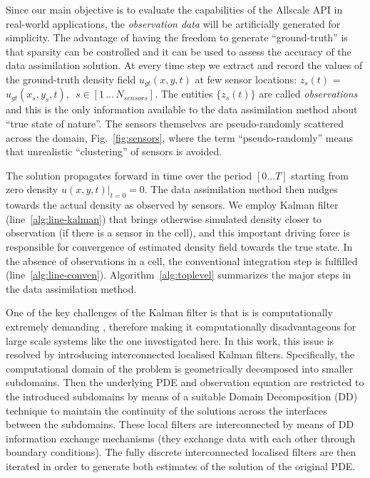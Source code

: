 \documentclass[acmsmall,review,anonymous]{acmart}\settopmatter{printfolios=true,printccs=false,printacmref=false}
\begin{document}
Since our main objective is to evaluate the capabilities of the Allscale API in real-world applications, the \textit{observation data} will be artificially generated for simplicity. The advantage of having the freedom to generate ``ground-truth'' is that sparsity can be controlled and it can be used to assess the accuracy of the data assimilation solution.  At every time step we extract and record the values of the ground-truth density field $u_{gt}(x,y,t)$ at few sensor locations: $z_s(t)$ = $u_{gt}(x_s,y_s,t)$, $\,\,s \in [1\,{\ldots}\,N_{sensors}]$. The entities $\{z_s(t)\}$ are called \textit{observations} and this is the only information available to the data assimilation method about ``true state of nature''. The sensors themselves are pseudo-randomly scattered across the domain, Fig.~\ref{fig:sensors}, where the term ``pseudo-randomly'' means that unrealistic ``clustering'' of sensors is avoided. 

The solution propagates forward in time over the period $[0 \ldots T]$ starting from zero density $u(x,y,t)\rvert_{t=0} = 0$. The data assimilation method then nudges towards the actual density as observed by sensors. We employ Kalman filter (line~\ref{alg:line-kalman}) that brings otherwise simulated density closer to observation (if there is a sensor in the cell), and this important driving force is responsible for convergence of estimated density field towards the true state. In the absence of observations in a cell, the conventional integration step is fulfilled (line~\ref{alg:line-conven}).  Algorithm~\ref{alg:toplevel} summarizes the major steps in the data assimilation method.

One of the key challenges of the Kalman filter is that is is computationally extremely demanding  \cite{verhaegen1986numerical}, therefore  making it computationally disadvantageous for large scale systems like the one investigated here.
In this work, this issue is resolved by introducing interconnected localised Kalman filters. Specifically, the computational domain of the problem is geometrically decomposed into smaller subdomains. Then the underlying PDE and observation equation are restricted to the introduced subdomains by means of a suitable Domain Decomposition (DD) technique to maintain the continuity of the solutions across the interfaces between the subdomains. These local filters are interconnected by means of DD information exchange mechanisms (they exchange data with each other through boundary conditions). The fully discrete interconnected localised filters are then iterated in order to generate both estimates of the solution of the original PDE.
\end{document}
